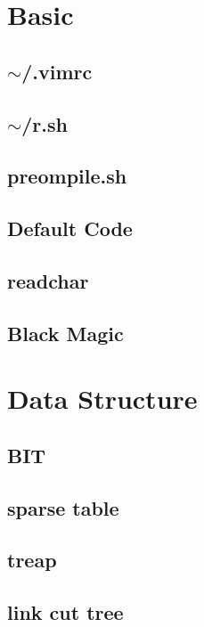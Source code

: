 
\section{Basic}
\subsection{$\sim$/.vimrc}

\subsection{$\sim$/r.sh}

\subsection{preompile.sh}

\subsection{Default Code}

\subsection{readchar}

\subsection{Black Magic}


\section{Data Structure}
\subsection{BIT}

\subsection{sparse table}

\subsection{treap}

\subsection{link cut tree}


